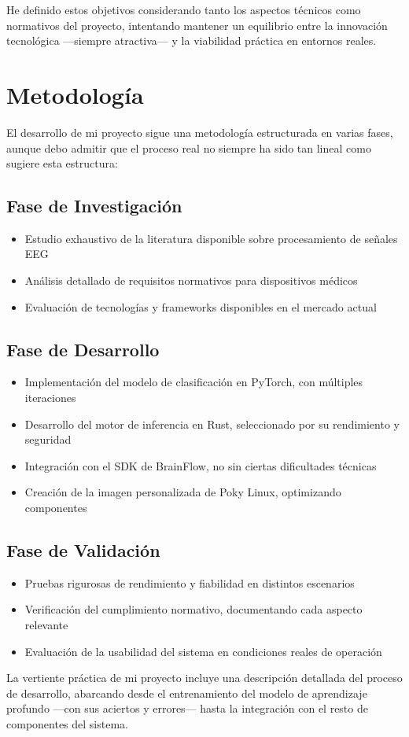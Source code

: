 He definido estos objetivos considerando tanto los aspectos técnicos como normativos del proyecto, intentando mantener un equilibrio entre la innovación tecnológica —siempre atractiva— y la viabilidad práctica en entornos reales.

\newpage
\section{Metodología}
El desarrollo de mi proyecto sigue una metodología estructurada en varias fases, aunque debo admitir que el proceso real no siempre ha sido tan lineal como sugiere esta estructura:

\subsection{Fase de Investigación}
\begin{itemize}
    \item Estudio exhaustivo de la literatura disponible sobre procesamiento de señales EEG
    \item Análisis detallado de requisitos normativos para dispositivos médicos
    \item Evaluación de tecnologías y frameworks disponibles en el mercado actual
\end{itemize}

\subsection{Fase de Desarrollo}
\begin{itemize}
    \item Implementación del modelo de clasificación en PyTorch, con múltiples iteraciones
    \item Desarrollo del motor de inferencia en Rust, seleccionado por su rendimiento y seguridad
    \item Integración con el SDK de BrainFlow, no sin ciertas dificultades técnicas
    \item Creación de la imagen personalizada de Poky Linux, optimizando componentes
\end{itemize}

\subsection{Fase de Validación}
\begin{itemize}
    \item Pruebas rigurosas de rendimiento y fiabilidad en distintos escenarios
    \item Verificación del cumplimiento normativo, documentando cada aspecto relevante
    \item Evaluación de la usabilidad del sistema en condiciones reales de operación
\end{itemize}

La vertiente práctica de mi proyecto incluye una descripción detallada del proceso de desarrollo, abarcando desde el entrenamiento del modelo de aprendizaje profundo —con sus aciertos y errores— hasta la integración con el resto de componentes del sistema.